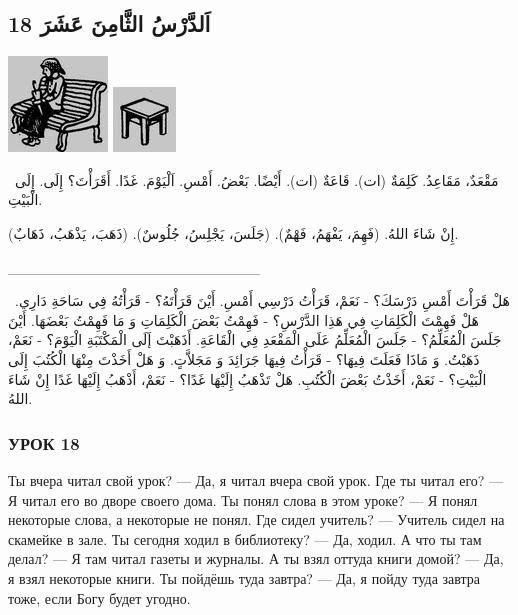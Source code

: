 \documentclass[a5paper]{article}
\begin{document}
\subsection{18 اَلدَّرْسُ الثَّامِنَ عَشَرَ}
 \includegraphics[width=1.0417in,height=1in]{MuhammadBagauddinlatinized-img032.jpg}   \includegraphics[width=0.6563in,height=0.6772in]{MuhammadBagauddinlatinized-img033.jpg} 

\ مَقْعَدٌ، مَقَاعِدُ. كَلِمَةٌ (ات). قَاعَةٌ (ات). أَيْضًا. بَعْضُ. أَمْسِ. اَلْيَوْمَ. غَدًا. أَقَرَأْتَ؟ إِلَى. إِلَى الْبَيْتِ.

إِنْ شَاءَ اللهُ. (فَهِمَ، يَفْهَمُ، فَهْمٌ). (جَلَسَ، يَجْلِسُ، جُلُوسٌ). (ذَهَبَ، يَذْهَبُ، ذَهَابٌ).

\_\_\_\_\_\_\_\_\_\_\_\_\_\_\_\_\_\_\_\_\_\_\_\_

\ هَلْ قَرَأْتَ أَمْسِ دَرْسَكَ؟ - نَعَمْ، قَرَأْتُ دَرْسِي أَمْسِ. أَيْنَ قَرَأْتَهُ؟ - قَرَأْتُهُ فِي سَاحَةِ دَارِي. هَلْ فَهِمْتَ الْكَلِمَاتِ فِي هَذِا الدَّرْسِ؟ - فَهِمْتُ بَعْضَ الْكَلِمَاتِ وَ مَا فَهِمْتُ بَعْضَهَا. أَيْنَ جَلَسَ الْمُعَلِّمُ؟ - جَلَسَ الْمُعَلِّمُ عَلَى الْمَقْعَدِ فِي الْقَاعَةِ. أَذَهَبْتَ إَلَى الْمَكْتَبَةِ الْيَوْمَ؟ - نَعَمْ، ذَهَبْتُ. وَ مَاذَا فَعَلَتَ فِيهَا؟ - قَرَأْتُ فِيهَا جَرَائِدَ وَ مَجَلاَّتٍ. وَ هَلْ أَخَذْتَ مِنْهَا الْكُتُبَ إِلَى الْبَيْتِ؟ - نَعَمْ، أَخَذْتُ بَعْضَ الْكُتُبِ. هَلْ تَذْهَبُ إِلَيْهَا غَدًا؟ - نَعَمْ، أَذْهَبُ إِلَيْهَا غَدًا إِنْ شَاءَ اللهُ.

\subsubsection{УРОК 18}
Ты вчера читал свой урок? — Да, я читал вчера свой урок. Где ты читал его? — Я читал его во дворе своего дома. Ты понял слова в этом уроке? — Я понял некоторые слова, а некоторые не понял. Где сидел учитель? — Учитель сидел на скамейке в зале. Ты сегодня ходил в библиотеку? — Да, ходил. А что ты там делал? — Я там читал газеты и журналы. А ты взял оттуда книги домой? — Да, я взял некоторые книги. Ты пойдёшь туда завтра? — Да, я пойду туда завтра тоже, если Богу будет угодно.
\end{document}
